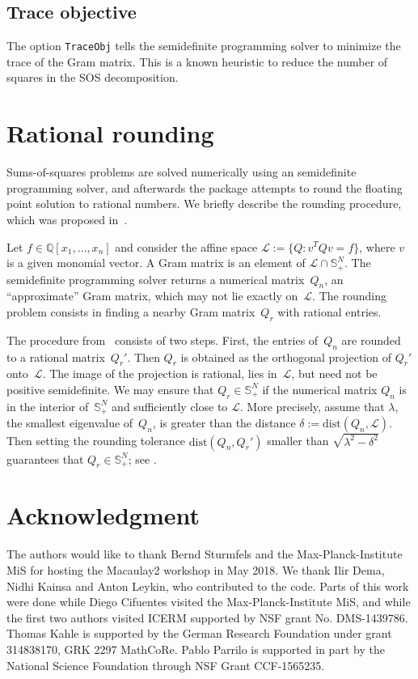 \documentclass[11pt]{amsart}
\theoremstyle{plain}%
\theoremstyle{definition}
\theoremstyle{remark}
\newcommand{\Mac}{Macaulay2\xspace}
\newcommand{\QQ}{\mathbb{Q}}
\begin{document}
\subsection*{Trace objective}
The option \verb|TraceObj| tells the semidefinite programming solver to minimize the trace of the Gram matrix.
This is a known heuristic to reduce the number of squares in the SOS decomposition.

\appendix

\section{Rational rounding}%
\label{sec:rounding}

Sums-of-squares problems are solved numerically using an semidefinite programming solver,
and afterwards the package attempts to round the floating point solution to rational numbers.
We briefly describe the rounding procedure, which was proposed in~\cite{peyrl2008computing}.

Let $f\in \QQ[x_1,\dots,x_n]$ and consider the affine space $\mathcal{L}:= \{Q: v^T\! Q v \!=\! f\}$, where $v$ is a given monomial vector.
A Gram matrix is an element of $\mathcal{L}\cap \mathbb{S}_+^N$.
The semidefinite programming solver returns a numerical matrix~$Q_n$, an ``approximate'' Gram matrix, which may not lie exactly on~$\mathcal{L}$.
The rounding problem consists in finding a nearby Gram matrix~$Q_r$ with rational entries.

The procedure from~\cite{peyrl2008computing} consists of two steps.
First, the entries of~$Q_n$ are rounded to a rational matrix~$Q_r'$.
Then $Q_r$ is obtained as the orthogonal projection of $Q_r'$ onto~$\mathcal{L}$.
The image of the projection is rational, lies in~$\mathcal{L}$, but need not be positive semidefinite.
We may ensure that $Q_r\in \mathbb{S}_+^N$ if the numerical matrix $Q_n$ is in the interior of~$\mathbb{S}_+^N$ and sufficiently close to $\mathcal{L}$.
More precisely, assume that $\lambda$, the smallest eigenvalue of~$Q_n$, is greater than the distance $\delta:= \textrm{dist}(Q_n,\mathcal{L})$.
Then setting the {rounding tolerance} $\textrm{dist}(Q_n,Q_r')$ smaller than $\sqrt{\lambda^2 - \delta^2}$ guarantees that $Q_r \in \mathbb{S}_+^N$; 
see \cite[Prop.~8]{peyrl2008computing}.
\section*{Acknowledgment}
\label{sec:acknowledgement}
The authors would like to thank Bernd Sturmfels and the Max-Planck-Institute MiS for hosting the \Mac workshop in May 2018.
We thank Ilir Dema, Nidhi Kainsa and Anton Leykin, who contributed to the code.
Parts of this work were done while Diego Cifuentes visited the Max-Planck-Institute MiS, and while the first two authors visited ICERM supported by NSF grant No. DMS-1439786.
Thomas Kahle is supported by the German Research Foundation under grant 314838170, GRK 2297 MathCoRe.
Pablo Parrilo is supported in part by the National Science Foundation through NSF Grant CCF-1565235.



\end{document}
